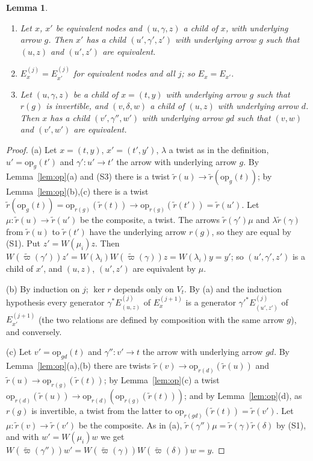 \documentclass[11pt]{amsart}
\newtheorem{lem}[thm]{Lemma}
\theoremstyle{definition}
\newcommand{\opn}{\mathrm{op}}
\begin{document}
\begin{lem}\label{lem:dep}
\begin{enumerate}
\item[(a)] Let $x$, $x'$ be equivalent nodes and $(u,\gamma,z)$ a
child of $x$, with underlying arrow $g$. Then $x'$ has a child
$(u',\gamma',z')$ with underlying arrow $g$ such that $(u,z)$ and
$(u',z')$ are equivalent.
\item[(b)] $E^{(j)}_x=E^{(j)}_{x'}$ for equivalent nodes and all $j$;
so $E_x=E_{x'}$.
\item[(c)] Let $(u,\gamma,z)$ be a child of $x=(t,y)$ with underlying
arrow $g$ such that $r(g)$ is invertible, and $(v,\delta,w)$ a child
of $(u,z)$ with underlying arrow $d$. Then $x$ has a child
$(v',\gamma'',w')$ with underlying arrow $gd$ such that $(v,w)$ and
$(v',w')$ are equivalent.
\end{enumerate}
\end{lem}
\begin{proof}
(a) Let $x=(t,y)$, $x'=(t',y')$, $\lambda$ a twist as in the
definition, $u'=\opn_g(t')$ and $\gamma'\colon u'\to t'$ the arrow
with underlying arrow $g$. By Lemma~\ref{lem:op}(a) and (S3) there is
a twist $\tilde r(u)\to\tilde r(\opn_g(t))$; by
Lemma~\ref{lem:op}(b),(c) there is a twist $\tilde r(\opn_g(t))=
\opn_{r(g)}(\tilde r(t))\to\opn_{r(g)}(\tilde r(t'))=\tilde r(u')$. Let
$\mu\colon\tilde r(u)\to\tilde r(u')$ be the composite, a twist. The
arrows $\tilde r(\gamma')\mu$ and $\lambda\tilde r(\gamma)$ from
$\tilde r(u)$ to $\tilde r(t')$ have the underlying arrow $r(g)$, so
they are equal by (S1). Put $z'=W(\mu_i)z$. Then $W(\tilde\varpi(\gamma'
))z'=W(\lambda_i)W(\tilde\varpi(\gamma))z=W(\lambda_i)y=y'$; so
$(u',\gamma',z')$ is a child of $x'$, and $(u,z)$, $(u',z')$ are
equivalent by $\mu$.

(b) By induction on $j$; $\ker r$ depends only on $V_t$. By (a) and
the induction hypothesis every generator $\gamma^*E^{(j)}_{(u,z)}$ of
$E^{(j+1)}_x$ is a generator $\gamma'^*E^{(j)}_{(u',z')}$ of
$E^{(j+1)}_{x'}$ (the two relations are defined by composition with
the same arrow $g$), and conversely.

(c) Let $v'=\opn_{gd}(t)$ and $\gamma''\colon v'\to t$ the arrow with
underlying arrow $gd$. By Lemma~\ref{lem:op}(a),(b) there are twists
$\tilde r(v)\to\opn_{r(d)}(\tilde r(u))$ and $\tilde r(u)\to\opn_{r(g)}
(\tilde r(t))$; by Lemma~\ref{lem:op}(c) a twist
$\opn_{r(d)}(\tilde r(u))\to\opn_{r(d)}(\opn_{r(g)}(\tilde r(t)))$; and
by Lemma~\ref{lem:op}(d), as $r(g)$ is invertible, a twist from the
latter to $\opn_{r(gd)}(\tilde r(t))=\tilde r(v')$. Let $\mu\colon
\tilde r(v)\to\tilde r(v')$ be the composite. As in (a),
$\tilde r(\gamma'')\mu=\tilde r(\gamma)\tilde r(\delta)$ by (S1), and
with $w'=W(\mu_i)w$ we get $W(\tilde\varpi(\gamma''))w'=W(\tilde\varpi(
\gamma))W(\tilde\varpi(\delta))w=y$.
\end{proof}
\end{document}
